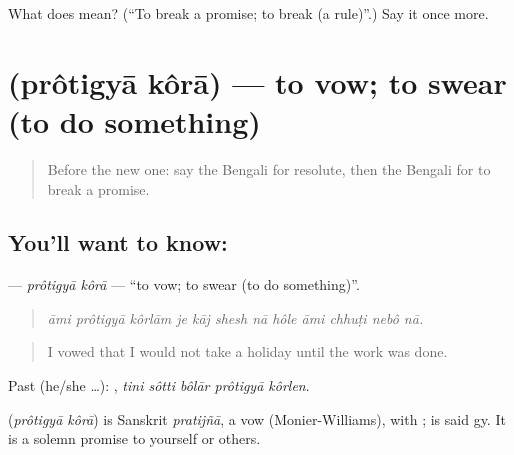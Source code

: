 \begin{tcolorbox}[breakable,colback=teal!4,colframe=teal!35!black,title={Before you move on}]
What does   mean? (\textquotedblleft{}To break a promise; to break (a rule)\textquotedblright{}.) Say it once more.
\end{tcolorbox}
\section[\texorpdfstring{\bn{প্রতিজ্ঞা} \bn{করা} (prôtigyā kôrā)}{প্রতিজ্ঞা করা (prôtigyā kôrā)}]{  (prôtigyā kôrā) — to vow; to swear (to do something)}

\label{lesson:BN-C379-protigya-kora}



\begin{quote}
Before the new one: say the Bengali for resolute, then the Bengali for to break a promise.
\end{quote}

\subsection*{You'll want to know:  }
\textbf{ } — \emph{prôtigyā kôrā} — \textquotedblleft{}to vow; to swear (to do something)\textquotedblright{}.

\begin{quote}
           
\end{quote}

\begin{quote}
\emph{āmi prôtigyā kôrlām je kāj shesh nā hôle āmi chhuṭi nebô nā.}
\end{quote}

\begin{quote}
I vowed that I would not take a holiday until the work was done.
\end{quote}

Past (he/she …):     , \emph{tini sôtti bôlār prôtigyā kôrlen}.

\begin{cousinweb}
\textbf{ } (\emph{prôtigyā kôrā}) is Sanskrit \emph{pratijñā}, a vow (Monier-Williams), with ;  is said gy. It is a solemn promise to yourself or others.
\end{cousinweb}

